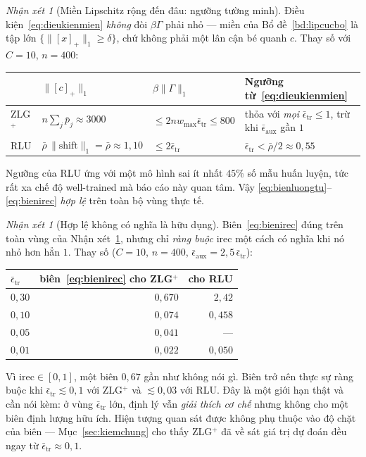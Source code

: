 \documentclass[11pt]{article}
\theoremstyle{remark}
\newtheorem{nhanxet}[dinhly]{Nhận xét}
\newcommand{\pos}[1]{\left[#1\right]_+}
\begin{document}
\begin{nhanxet}[Miền Lipschitz rộng đến đâu: ngưỡng tường minh]
\label{nx:nguongmien}
Điều kiện~\eqref{eq:dieukienmien} \emph{không} đòi $\beta\Gamma$ phải nhỏ ---
miền của Bổ đề~\ref{bd:lipcucbo} là tập lớn $\{\|\pos{x}\|_1\ge\delta\}$, chứ
không phải một lân cận bé quanh $c$. Thay số với $C=10$, $n=400$:
\begin{center}
\footnotesize
\begin{tabular}{@{}llll@{}}
\toprule
& $\|\pos{c}\|_1$ & $\beta\|\Gamma\|_1$ & Ngưỡng từ~\eqref{eq:dieukienmien} \\
\midrule
ZLG$^+$ & $n\sum_j\bar p_j \approx 3000$ & $\le 2nw_{\max}\bar\epsilon_{\mathrm{tr}} \le 800$
 & thỏa với \emph{mọi} $\bar\epsilon_{\mathrm{tr}}\le1$, trừ khi
   $\bar\epsilon_{\mathrm{aux}}$ gần $1$ \\
RLU & $\bar\rho\,\|\mathrm{shift}\|_1 = \bar\rho \approx 1{,}10$
 & $\le 2\bar\epsilon_{\mathrm{tr}}$
 & $\bar\epsilon_{\mathrm{tr}} < \bar\rho/2 \approx 0{,}55$ \\
\bottomrule
\end{tabular}
\end{center}
Ngưỡng của RLU ứng với một mô hình sai ít nhất $45\%$ số mẫu huấn luyện, tức
rất xa chế độ well-trained mà báo cáo này quan tâm. Vậy
\eqref{eq:bienluongtu}--\eqref{eq:bienirec} \emph{hợp lệ} trên toàn bộ vùng
thực tế.
\end{nhanxet}

\begin{nhanxet}[Hợp lệ không có nghĩa là hữu dụng]
\label{nx:hopleHuudung}
Biên~\eqref{eq:bienirec} đúng trên toàn vùng của
Nhận xét~\ref{nx:nguongmien}, nhưng chỉ \emph{ràng buộc} $\mathrm{irec}$ một
cách có nghĩa khi nó nhỏ hơn hẳn $1$. Thay số ($C=10$, $n=400$,
$\bar\epsilon_{\mathrm{aux}} = 2{,}5\,\bar\epsilon_{\mathrm{tr}}$):
\begin{center}
\footnotesize
\begin{tabular}{@{}lrr@{}}
\toprule
$\bar\epsilon_{\mathrm{tr}}$ & biên~\eqref{eq:bienirec} cho ZLG$^+$ & cho RLU \\
\midrule
$0{,}30$ & $0{,}670$ & $2{,}42$ \\
$0{,}10$ & $0{,}074$ & $0{,}458$ \\
$0{,}05$ & $0{,}041$ & --- \\
$0{,}01$ & $0{,}022$ & $0{,}050$ \\
\bottomrule
\end{tabular}
\end{center}
Vì $\mathrm{irec}\in[0,1]$, một biên $0{,}67$ gần như không nói gì. Biên trở
nên thực sự ràng buộc khi $\bar\epsilon_{\mathrm{tr}}\lesssim 0{,}1$ với
ZLG$^+$ và $\lesssim 0{,}03$ với RLU. Đây là một giới hạn thật và cần nói
kèm: ở vùng $\bar\epsilon_{\mathrm{tr}}$ lớn, định lý vẫn \emph{giải thích cơ
chế} nhưng không cho một biên định lượng hữu ích. Hiện tượng quan sát được
không phụ thuộc vào độ chặt của biên --- Mục~\ref{sec:kiemchung} cho thấy
ZLG$^+$ đã về sát giá trị dự đoán đều ngay từ
$\bar\epsilon_{\mathrm{tr}}\approx0{,}1$.
\end{nhanxet}
\end{document}
